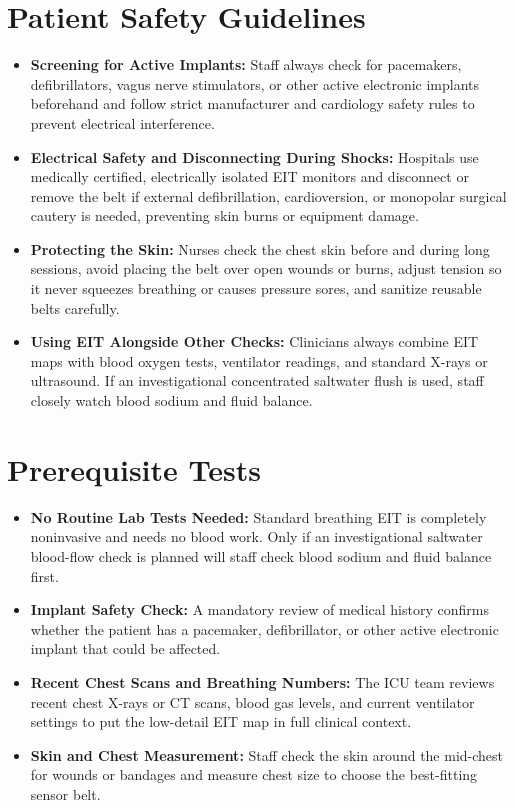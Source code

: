 \section{Patient Safety Guidelines}
\begin{itemize}
    \item \textbf{Screening for Active Implants:} Staff always check for pacemakers, defibrillators, vagus nerve stimulators, or other active electronic implants beforehand and follow strict manufacturer and cardiology safety rules to prevent electrical interference.
    \item \textbf{Electrical Safety and Disconnecting During Shocks:} Hospitals use medically certified, electrically isolated EIT monitors and disconnect or remove the belt if external defibrillation, cardioversion, or monopolar surgical cautery is needed, preventing skin burns or equipment damage.
    \item \textbf{Protecting the Skin:} Nurses check the chest skin before and during long sessions, avoid placing the belt over open wounds or burns, adjust tension so it never squeezes breathing or causes pressure sores, and sanitize reusable belts carefully.
    \item \textbf{Using EIT Alongside Other Checks:} Clinicians always combine EIT maps with blood oxygen tests, ventilator readings, and standard X-rays or ultrasound. If an investigational concentrated saltwater flush is used, staff closely watch blood sodium and fluid balance.
\end{itemize}

\section{Prerequisite Tests}
\begin{itemize}
    \item \textbf{No Routine Lab Tests Needed:} Standard breathing EIT is completely noninvasive and needs no blood work. Only if an investigational saltwater blood-flow check is planned will staff check blood sodium and fluid balance first.
    \item \textbf{Implant Safety Check:} A mandatory review of medical history confirms whether the patient has a pacemaker, defibrillator, or other active electronic implant that could be affected.
    \item \textbf{Recent Chest Scans and Breathing Numbers:} The ICU team reviews recent chest X-rays or CT scans, blood gas levels, and current ventilator settings to put the low-detail EIT map in full clinical context.
    \item \textbf{Skin and Chest Measurement:} Staff check the skin around the mid-chest for wounds or bandages and measure chest size to choose the best-fitting sensor belt.
\end{itemize}

